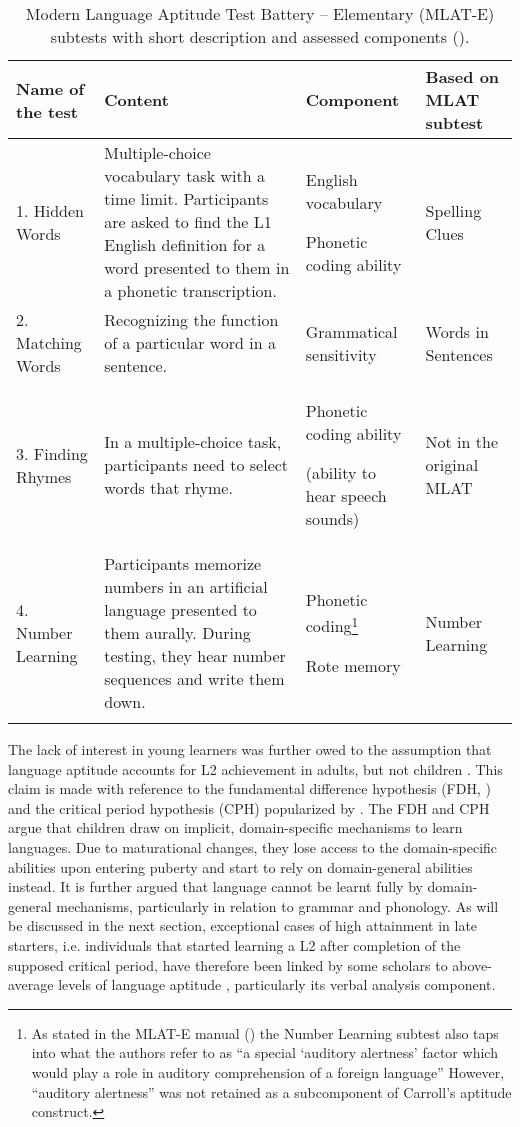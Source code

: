 \documentclass[output=paper]{langscibook}
\begin{document}
\begin{sidewaystable}
\caption{Modern Language Aptitude Test Battery – Elementary (MLAT-E) subtests with short description and assessed components (\citealt{CarrollSapon1976}).\label{tab:01:2}}
\begin{tabularx}{\textwidth}{lQQl}
\lsptoprule
{Name of the test} & {Content} & {Component} & {Based on MLAT subtest}\\\midrule
{1. Hidden Words} & {Multiple-choice vocabulary task with a time limit. Participants are asked to find the L1 English definition for a word presented to them in a phonetic transcription.} & {English vocabulary} 

{Phonetic coding ability} & {Spelling Clues}\\
{2. Matching Words}  & {Recognizing the function of a particular word in a sentence.} & {Grammatical sensitivity} & {Words in Sentences}\\
{3. Finding Rhymes} & {In a multiple-choice task, participants need to select words that rhyme.} & {Phonetic coding ability}

{(ability to hear speech sounds)} & {Not in the original MLAT}\\
{4. Number Learning} & {Participants memorize numbers in an artificial language presented to them aurally. During testing, they hear number sequences and write them down.} & Phonetic coding\footnote{As stated in the MLAT-E manual (\citealt[2]{CarrollSapon1976}) the Number Learning subtest also taps into what the authors refer to as “a special `auditory alertness' factor which would play a role in auditory comprehension of a foreign language” However, “auditory alertness” was not retained as a subcomponent of Carroll’s aptitude construct.}

{Rote memory} & {Number Learning}\\
\lspbottomrule
\end{tabularx}
\end{sidewaystable}

The lack of interest in young learners was further owed to the assumption that language aptitude accounts for L2 achievement in adults, but not children \citep{Li2018}. This claim is made with reference to the fundamental difference hypothesis (FDH, \citealt{BleyVroman1989}) and the critical period hypothesis (CPH) popularized by \citet{Lenneberg1967}. The FDH and CPH argue that children draw on implicit, domain-specific mechanisms to learn languages. Due to maturational changes, they lose access to the domain-specific abilities upon entering puberty and start to rely on domain-general abilities instead. It is further argued that language cannot be learnt fully by domain-general mechanisms, particularly in relation to grammar and phonology. As will be discussed in the next section, exceptional cases of high attainment in late starters, i.e. individuals that started learning a L2 after completion of the supposed critical period, have therefore been linked by some scholars to above-average levels of language aptitude \citep{DeKeyser2000}, particularly its verbal analysis component.
\end{document}
